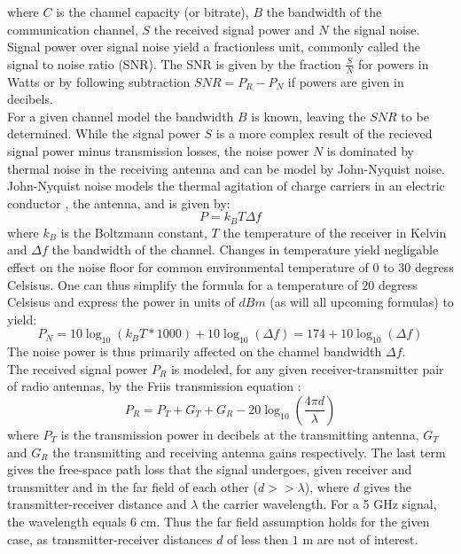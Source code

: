 where $C$ is the channel capacity (or bitrate), $B$ the bandwidth of the 
communication channel, $S$ the received signal power and $N$ the signal noise. 
Signal power over signal noise yield a fractionless unit, commonly called the 
signal to noise ratio (SNR). The SNR is given by the fraction $\frac{S}{N}$ for 
powers in Watts or by following subtraction $SNR = P_R - P_N$ if powers are 
given in decibels.\\
For a given channel model the bandwidth $B$ is known, leaving the $SNR$ to be 
determined. While the signal power $S$ is a more complex result of the recieved 
signal power minus transmission losses, the noise power $N$ is dominated by 
thermal noise in the receiving antenna and can be model by John-Nyquist noise. 
John-Nyquist noise models the thermal agitation of charge carriers in an electric
conductor \cite{nyquist1928thermal}, the antenna, and is given by: 
\begin{equation}
    P = k_B T \Delta f
\end{equation}
where $k_B$ is the Boltzmann constant, $T$ the temperature of the receiver in 
Kelvin and $\Delta f$ the bandwidth of the channel. Changes in temperature yield
negligable effect on the noise floor for common environmental temperature of $0$ 
to $30$ degress Celsisus. One can thus simplify the formula for a temperature
of $20$ degress Celsisus and express the power in units of $dBm$ (as will all 
upcoming formulas) to yield: 
\begin{equation} \label{eq:noise}
    P_N = 10 \log_{10}(k_B T * 1000) + 10 \log_{10}(\Delta f) = 174 + 10 \log_{10}(\Delta f)
\end{equation}
The noise power is thus primarily affected  on the channel bandwidth $\Delta f$. \\
The received signal power $P_R$ is modeled, for any given receiver-transmitter pair
of radio antennas, by the Friis transmission equation \cite{friis1946note}: 
\begin{equation} \label{eq:friis}
    P_R = P_T + G_T + G_R - 20 \log_{10} (\frac{4 \pi d}{\lambda})
\end{equation}
where $P_T$ is the transmission power in decibels at the transmitting antenna, 
$G_T$ and $G_R$ the transmitting and receiving antenna gains respectively. The 
last term gives the free-space path loss that the signal undergoes, given receiver
and transmitter and in the far field of each other ($d >> \lambda$), where $d$ 
gives the transmitter-receiver distance and $\lambda$ the carrier wavelength. 
For a 5 GHz signal, the wavelength equals $6$ cm. Thus the far field assumption holds
for the given case, as transmitter-receiver distances $d$ of less then $1$ m are
not of interest. \\


